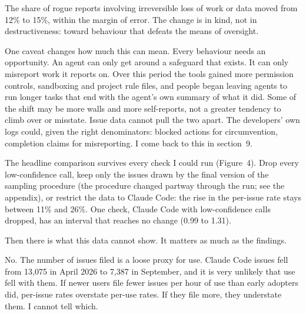  The share of rogue reports involving irreversible loss of work or data moved from 12\% to 15\%, within the margin of error. The change is in kind, not in destructiveness: toward behaviour that defeats the means of oversight.

One caveat changes how much this can mean. Every behaviour needs an opportunity. An agent can only get around a safeguard that exists. It can only misreport work it reports on. Over this period the tools gained more permission controls, sandboxing and project rule files, and people began leaving agents to run longer tasks that end with the agent’s own summary of what it did.
Some of the shift may be more walls and more self-reports, not a greater tendency to climb over or misstate. Issue data cannot pull the two apart. The developers’ own logs could, given the right denominators: blocked actions for circumvention, completion claims for misreporting. I come back to this in section~9.



The headline comparison survives every check I could run (Figure~4). Drop every low-confidence call, keep only the issues drawn by the final version of the sampling procedure (the procedure changed partway through the run; see the appendix), or restrict the data to Claude Code: the rise in the per-issue rate stays between 11\% and 26\%. One check, Claude Code with low-confidence calls dropped, has an interval that reaches no change (0.99 to 1.31).

Then there is what this data cannot show. It matters as much as the findings.

 No. The number of issues filed is a loose proxy for use. Claude Code issues fell from 13,075 in April 2026 to 7,387 in September, and it is very unlikely that use fell with them. If newer users file fewer issues per hour of use than early adopters did, per-issue rates overstate per-use rates. If they file more, they understate them. I cannot tell which.

